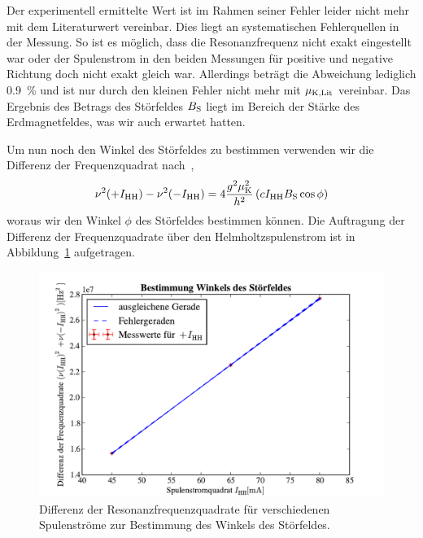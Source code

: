 \documentclass[paper=a4,
	fontsize=10pt,
	DIV=18,
	twocolumn,
	parskip=half
	]{scrartcl}
\numberwithin{equation}{section}    %
\begin{document}
Der experimentell ermittelte Wert ist im Rahmen seiner Fehler leider nicht mehr mit dem Literaturwert vereinbar. Dies liegt an systematischen Fehlerquellen in der Messung. So ist es möglich, dass die Resonanzfrequenz nicht exakt eingestellt war oder der Spulenstrom in den beiden Messungen für positive und negative Richtung doch nicht exakt gleich war. Allerdings beträgt die Abweichung lediglich \SI{0.9}{\percent} und ist nur durch den kleinen Fehler nicht mehr mit $\mu_{\rm K, Lit}$ vereinbar.
Das Ergebnis des Betrags des Störfeldes $B_{\rm S}$ liegt im Bereich der Stärke des Erdmagnetfeldes, was wir auch erwartet hatten.

Um nun noch den Winkel  des Störfeldes zu bestimmen verwenden wir die Differenz der Frequenzquadrat nach~\citet{anleitung},
\begin{equation}
	\nu^2(+I_{\rm HH}) - \nu^2(-I_{\rm HH}) = 4\frac{g^2\mu_{\rm K}^2}{h^2} \left( c I_{\rm HH} B_{\rm S} \cos\phi \right)
	\label{eq.stoerwinkel}
\end{equation}
woraus wir den Winkel $\phi$ des Störfeldes bestimmen können.
Die Auftragung der Differenz der Frequenzquadrate über den Helmholtzspulenstrom ist in Abbildung~\ref{fig.stoerwinkel} aufgetragen.

\begin{figure}[htp]
	\begin{center}
		\includegraphics[width=\columnwidth]{Data-Plots/10-helmholtz-diff.pdf}
	\caption{Differenz der Resonanzfrequenzquadrate für verschiedenen Spulenströme zur Bestimmung des Winkels des Störfeldes.}
	\label{fig.stoerwinkel}
	\end{center}
\end{figure}
\end{document}
